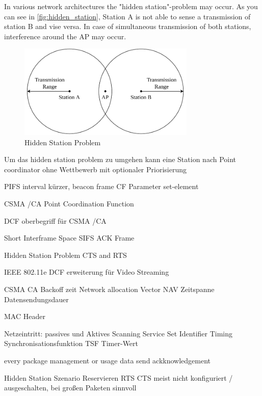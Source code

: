 \documentclass[]{nsm-thesis}
\begin{document}
In various network architectures the "hidden station"-problem may occur. As you can see in \autoref{fig:hidden_station}, Station A is not able to sense a transmission of station B and vise versa. In case of simultaneous transmission of both stations, interference around the \ac{AP} may occur. 
\begin{figure}%
	\centering
	\includegraphics[width=0.75\textwidth]{figures/hidden_station.pdf}
	\caption{Hidden Station Problem}%
	\label{fig:hidden_station}%
\end{figure}


Um das hidden station problem zu umgehen kann eine Station nach \textcite{sauter_wireless_2022} 
Point coordinator 
ohne Wettbewerb mit optionaler Priorisierung

PIFS interval kürzer, 
beacon frame
CF Parameter set-element

CSMA /CA
Point Coordination Function

\textcite{sauter_wireless_2022}
DCF oberbegriff für CSMA /CA
 
 
Short Interframe Space SIFS ACK Frame 
 
Hidden Station Problem 
CTS and RTS
 
IEEE 802.11e DCF erweiterung für Video Streaming

CSMA CA Backoff zeit
Network allocation Vector NAV Zeitspanne Datensendungsdauer

MAC Header

Netzeintritt:
passives und Aktives Scanning
Service Set Identifier
Timing Synchronisationsfunktion TSF Timer-Wert

\textcite{sauter_wireless_2022}
every package management or usage data send ackknowledgement

Hidden Station Szenario
Reservieren
RTS CTS
meist nicht konfiguriert / ausgeschalten, bei großen Paketen sinnvoll
\end{document}
